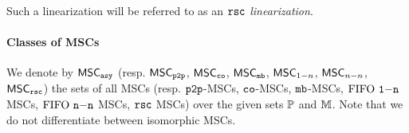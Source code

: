 Such a linearization will be referred to as an \emph{$\rsc$ linearization}.


\paragraph*{Classes of MSCs} 
We denote by $\asMSCs$ (resp. $\ppMSCs$, $\coMSCs$, $\mbMSCs$, $\onenMSCs$, $\nnMSCs$, $\rscMSCs$) the sets of all MSCs (resp. $\pp$-MSCs, $\co$-MSCs, $\mb$-MSCs, $\onen$ MSCs, $\nn$ MSCs, $\rsc$ MSCs) over the given sets $\Procs$ and $\Msg$. Note that we do not differentiate between isomorphic MSCs.
